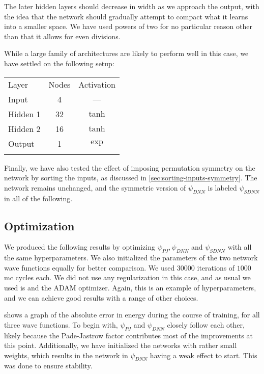\documentclass[Thesis.tex]{subfiles}
\begin{document}
The later hidden layers should decrease in width as we approach the output, with
the idea that the network should gradually attempt to compact what it learns
into a smaller space. We have used powers of two for no particular reason other
than that it allows for even divisions.

While a large family of architectures are likely to perform well in this case,
we have settled on the following setup:

\begin{center}
  \begin{tabular}{lcc}
    \toprule
    \addlinespace
    Layer & Nodes & Activation\\
    \addlinespace
    \midrule
    \addlinespace
    \addlinespace
    Input & 4 & ---\\
    Hidden 1& 32 & $\tanh$\\
    Hidden 2& 16 & $\tanh$\\
    Output & 1 & $\exp$\\
    \addlinespace
    \addlinespace
    \bottomrule
  \end{tabular}
\end{center}

Finally, we have also tested the effect of imposing permutation symmetry on the
network by sorting the inputs, as discussed in
\cref{sec:sorting-inputs-symmetry}. The network remains unchanged, and the
symmetric version of $\psi_{DNN}$ is labeled $\psi_{SDNN}$ in all of the following.


\subsection{Optimization}

We produced the following results by optimizing $\psi_{PJ}, \psi_{DNN}$ and
$\psi_{SDNN}$ with all the same hyperparameters. We also initialized the
parameters of the two network wave functions equally for better comparison.
We used $\num{30000}$ iterations of $1000$ \gls{mc} cycles each. We did not use any
regularization in this case, and as usual we used \acrlong{is} and the
ADAM optimizer. Again, this is an example of hyperparameters, and we can
achieve good results with a range of other choices.

 shows a graph of the absolute error in energy
during the course of training, for all three wave functions. To begin with,
$\psi_{PJ}$ and $\psi_{DNN}$ closely follow each other,
likely because the Pade-Jastrow factor contributes most of the improvements at
this point. Additionally, we have initialized the networks with rather small
weights, which results in the network in $\psi_{DNN}$ having a weak effect to
start. This was done to ensure stability.
\end{document}
